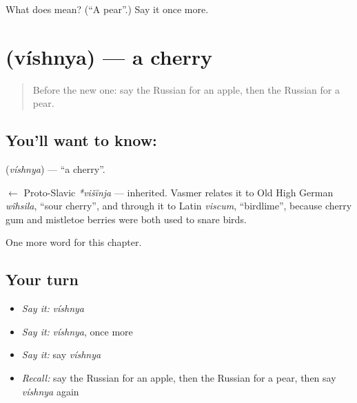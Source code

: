 \begin{tcolorbox}[breakable,colback=teal!4,colframe=teal!35!black,title={Before you move on}]
What does  mean? (\textquotedblleft{}A pear\textquotedblright{}.) Say it once more.
\end{tcolorbox}
\section[\texorpdfstring{\ru{вишня} (víshnya)}{вишня (víshnya)}]{ (víshnya) — a cherry}

\label{lesson:RU-C44-cherry}



\begin{quote}
Before the new one: say the Russian for an apple, then the Russian for a pear.
\end{quote}

\subsection*{You'll want to know: }
\textbf{} (\emph{víshnya}) — \textquotedblleft{}a cherry\textquotedblright{}.

\begin{cousinweb}
\textbf{} $\leftarrow$ Proto-Slavic \emph{*višĭnja} — inherited. Vasmer relates it to Old High German \emph{wîhsila}, \textquotedblleft{}sour cherry\textquotedblright{}, and through it to Latin \emph{viscum}, \textquotedblleft{}birdlime\textquotedblright{}, because cherry gum and mistletoe berries were both used to snare birds.
\end{cousinweb}

\begin{grammarlens}[title={What you've built}]
One more word for this chapter.
\end{grammarlens}

\subsection*{Your turn}
\begin{itemize}
\raggedright
  \item \emph{Say it:} \emph{víshnya}
  \item \emph{Say it:} \emph{víshnya}, once more
  \item \emph{Say it:} say \emph{víshnya}
  \item \emph{Recall:} say the Russian for an apple, then the Russian for a pear, then say \emph{víshnya} again
\end{itemize}

